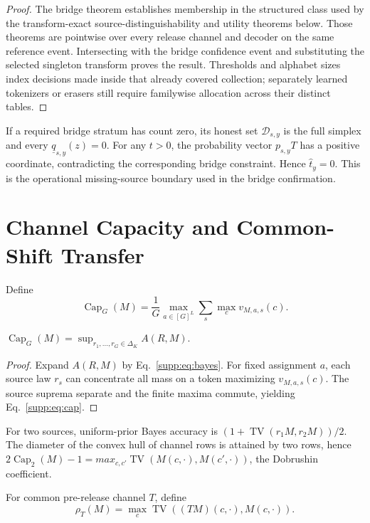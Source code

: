 \begin{proof}
The bridge theorem establishes membership in the structured class used by the
transform-exact source-distinguishability and utility theorems below. Those theorems are
pointwise over every release channel and decoder on the same reference event.
Intersecting with the bridge confidence event and substituting the selected
singleton transform proves the result. Thresholds and alphabet sizes index
decisions made inside that already covered collection; separately learned
tokenizers or erasers still require familywise allocation across their
distinct tables.
\end{proof}

If a required bridge stratum has count zero, its honest set
$\mathcal D_{s,y}$ is the full simplex and every
$\underline q_{s,y}(z)=0$. For any $t>0$, the probability vector $p_{s,y}T$
has a positive coordinate, contradicting the corresponding bridge constraint.
Hence $\widehat t_y=0$. This is the operational missing-source boundary used in
the bridge confirmation.

\section{Channel Capacity and Common-Shift Transfer}

Define
\begin{equation}
 \operatorname{Cap}_G(M)=\frac{1}{G}
 \max_{a\in[G]^L}\sum_s\max_c v_{M,a,s}(c).
 \label{supp:eq:cap}
\end{equation}

\begin{lemma}
$\operatorname{Cap}_G(M)=\sup_{r_1,\ldots,r_G\in\Delta_K}A(R,M)$.
\end{lemma}

\begin{proof}
Expand $A(R,M)$ by Eq.~\eqref{supp:eq:bayes}. For fixed assignment $a$, each
source law $r_s$ can concentrate all mass on a token maximizing
$v_{M,a,s}(c)$. The source suprema separate and the finite maxima commute,
yielding Eq.~\eqref{supp:eq:cap}.
\end{proof}

For two sources, uniform-prior Bayes accuracy is
$(1+\operatorname{TV}(r_1M,r_2M))/2$. The diameter of the convex hull of channel
rows is attained by two rows, hence
$2\operatorname{Cap}_2(M)-1=max_{c,c'}
\operatorname{TV}(M(c,\cdot),M(c',\cdot))$, the Dobrushin coefficient.

For common pre-release channel $T$, define
\begin{equation}
 \rho_T(M)=\max_c\operatorname{TV}((TM)(c,\cdot),M(c,\cdot)).
 \label{supp:eq:rho}
\end{equation}

